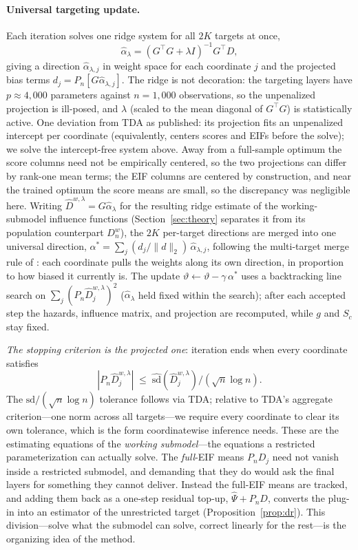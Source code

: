 \documentclass[11pt]{article}
\theoremstyle{remark}
\newcommand{\Pn}{P_n}
\begin{document}
\paragraph{Universal targeting update.} Each iteration solves one ridge system for all $2K$ targets at once,
\[
\widehat\alpha_\lambda = (G^\top G + \lambda I)^{-1} G^\top D,
\]
giving a direction $\widehat\alpha_{\lambda,j}$ in weight space for each coordinate $j$ and the projected bias terms $d_j = \Pn[G\widehat\alpha_{\lambda,j}]$. The ridge is not decoration: the targeting layers have $p \approx 4{,}000$ parameters against $n=1{,}000$ observations, so the unpenalized projection is ill-posed, and $\lambda$ (scaled to the mean diagonal of $G^\top G$) is statistically active. One deviation from TDA as published: its projection fits an unpenalized intercept per coordinate (equivalently, centers scores and EIFs before the solve); we solve the intercept-free system above. Away from a full-sample optimum the score columns need not be empirically centered, so the two projections can differ by rank-one mean terms; the EIF columns are centered by construction, and near the trained optimum the score means are small, so the discrepancy was negligible here. Writing $\widehat D^{w,\lambda} = G\widehat\alpha_\lambda$ for the resulting ridge estimate of the working-submodel influence functions (Section~\ref{sec:theory} separates it from its population counterpart $D^{w}_n$), the $2K$ per-target directions are merged into one universal direction, $\alpha^* = \sum_j (d_j/\|d\|_2)\, \widehat\alpha_{\lambda,j}$, following the multi-target merge rule of \citet{li2025tda}: each coordinate pulls the weights along its own direction, in proportion to how biased it currently is. The update $\vartheta \leftarrow \vartheta - \gamma\,\alpha^*$ uses a backtracking line search on $\sum_j(\Pn \widehat D^{w,\lambda}_j)^2$ ($\widehat\alpha_\lambda$ held fixed within the search); after each accepted step the hazards, influence matrix, and projection are recomputed, while $g$ and $S_c$ stay fixed.

\emph{The stopping criterion is the projected one}: iteration ends when every coordinate satisfies
\[
|\Pn \widehat D^{w,\lambda}_j| \;\le\; \widehat{\mathrm{sd}}(\widehat D^{w,\lambda}_j)\big/(\sqrt{n}\log n).
\]
The $\mathrm{sd}/(\sqrt n \log n)$ tolerance follows \citet{rytgaard2024} via TDA; relative to TDA's aggregate criterion---one norm across all targets---we require every coordinate to clear its own tolerance, which is the form coordinatewise inference needs. These are the estimating equations of the \emph{working submodel}---the equations a restricted parameterization can actually solve. The \emph{full}-EIF means $\Pn D_j$ need not vanish inside a restricted submodel, and demanding that they do would ask the final layers for something they cannot deliver. Instead the full-EIF means are tracked, and adding them back as a one-step residual top-up, $\widehat\Psi + \Pn D$, converts the plug-in into an estimator of the unrestricted target (Proposition~\ref{prop:dr}). This division---solve what the submodel can solve, correct linearly for the rest---is the organizing idea of the method.
\end{document}
